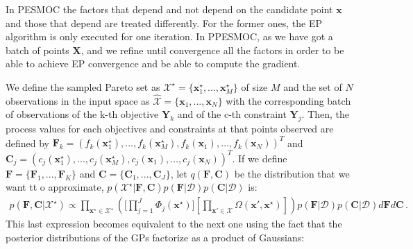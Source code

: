 In PESMOC the factors that depend and not depend on the candidate point $\mathbf{x}$ and those that depend are treated differently. For the former ones, the EP algorithm is only executed for one iteration. In PPESMOC, as we have got a batch of points $\mathbf{X}$, and we refine until convergence all the factors in order to be able to achieve EP convergence and be able to compute the gradient.

We define the sampled Pareto set as $\mathcal{X}^\star = \{\boldsymbol{x}^\star_{1},...,\boldsymbol{x}^\star_{M}\}$ of size $M$ and the set of $N$ observations in the input space as $\hat{\mathcal{X}} = \{\boldsymbol{x}_1,...,\boldsymbol{x}_N\}$ with the corresponding batch of observations of the k-th objective $\boldsymbol{Y}_k$ and of the c-th constraint $\boldsymbol{Y}_j$. Then, the process values for each objectives and constraints at that points observed are defined by $\boldsymbol{F}_k = ( f_k(\boldsymbol{x}^{\star}_1), ... , f_k(\boldsymbol{x}^{\star}_M), f_k(\boldsymbol{x}_1),  \ldots,f_k(\boldsymbol{x}_N))^T$ and $\boldsymbol{C}_j = ( c_j(\boldsymbol{x}^{\star}_1), ... , c_j(\boldsymbol{x}^{\star}_M), c_j(\boldsymbol{x}_1), \ldots,c_j(\boldsymbol{x}_N))^T$. If we define $\boldsymbol{F} = \{\boldsymbol{F}_1,...,\boldsymbol{F}_K\}$ and $\boldsymbol{C} = \{\boldsymbol{C}_1,...,\boldsymbol{C}_J\}$, let $q(\boldsymbol{F},\boldsymbol{C})$ be the distribution that we want tt
o approximate, $p(\mathcal{X}^{\star}|\textbf{F},\textbf{C}) p(\textbf{F}|\mathcal{D}) p(\textbf{C}|\mathcal{D})$ is:
\begin{align}
p(\boldsymbol{F},\boldsymbol{C}|\mathcal{X}^\star) \propto \prod_{\textbf{x}^\star\in \mathcal{X}^\star} 
        \left(
        \Bigg[\prod_{j=1}^{J}\Phi_j(\textbf{x}^{\star})\Bigg]
        \left[ 
        \prod_{\textbf{x}'\in \mathcal{X}} 
        \Omega(\textbf{x}',\textbf{x}^{\star})
        \right] 
        \right)
p(\textbf{F}|\mathcal{D}) p(\textbf{C}|\mathcal{D})
 d\textbf{F} d\textbf{C}\,.
\end{align}
This last expression becomes equivalent to the next one using
the fact that the posterior distributions of the GPs factorize
as a product of Gaussians:

